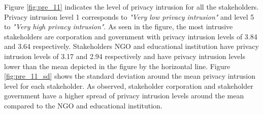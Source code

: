 Figure \ref{fig:pre_11} indicates the level of privacy intrusion for all the stakeholders. Privacy intrusion level 1 corresponds to \textit{"Very low privacy intrusion"} and level 5 to \textit{"Very high privacy intrusion"}. As seen in the figure, the most intrusive stakeholders are corporation and government with privacy intrusion levels of 3.84 and 3.64 respectively. Stakeholders NGO and educational institution have privacy intrusion levels of 3.17 and 2.94 respectively and have privacy intrusion levels lower than the mean depicted in the figure by the horizontal line. Figure \ref{fig:pre_11_sd} shows the standard deviation around the mean privacy intrusion level for each stakeholder. As observed, stakeholder corporation and stakeholder government have a higher spread of privacy intrusion levels around the mean compared to the NGO and educational institution.

